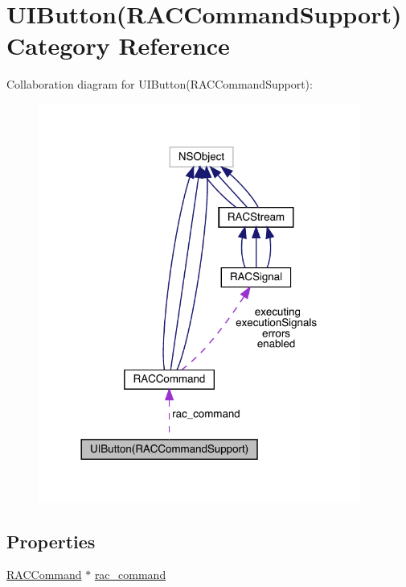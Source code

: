 \hypertarget{category_u_i_button_07_r_a_c_command_support_08}{}\section{U\+I\+Button(R\+A\+C\+Command\+Support) Category Reference}
\label{category_u_i_button_07_r_a_c_command_support_08}


Collaboration diagram for U\+I\+Button(R\+A\+C\+Command\+Support)\+:\nopagebreak
\begin{figure}[H]
\begin{center}
\leavevmode
\includegraphics[width=300pt]{category_u_i_button_07_r_a_c_command_support_08__coll__graph}
\end{center}
\end{figure}
\subsection*{Properties}
\begin{DoxyCompactItemize}
\item 
\mbox{\hyperlink{interface_r_a_c_command}{R\+A\+C\+Command}} $\ast$ \mbox{\hyperlink{category_u_i_button_07_r_a_c_command_support_08_a5eb6f25fc7ea50c164fb19287d5a2e3e}{rac\+\_\+command}}
\end{DoxyCompactItemize}


